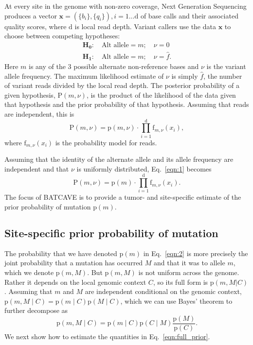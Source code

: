 \documentclass[a4,center,fleqn]{NAR}
\newcommand{\batcave}{BATCAVE\xspace}
\begin{document}
At every site in the genome with non-zero coverage, Next Generation Sequencing produces a vector $\mathbf{x}  = (\{b_i\},\{q_i\}), i = 1\dots \mathrm{d}$ of base calls and their associated quality scores, where $\mathrm{d}$ is local read depth.
Variant callers use the data $\mathbf{x}$ to choose between competing hypotheses:
\begin{equation}
  \label{eqn:hypothesis}
  \begin{array}{l}
    \mathbf{H_0}:\quad \textrm{Alt allele} = m;\quad\nu = 0\\
    \mathbf{H_1}:\quad \textrm{Alt allele} = m;\quad\nu = \hat{f}.
  \end{array}
\end{equation}
Here $m$ is any of the 3 possible alternate non-reference bases and $\nu$ is the variant allele frequency.
The maximum likelihood estimate of $\nu$ is simply $\hat{f}$, the number of variant reads divided by the local read depth.
The posterior probability of a given hypothesis, $\mathrm{P}(m,\nu)$, is the product of the likelihood of the data given that hypothesis and the prior probability of that hypothesis. 
Assuming that reads are independent, this is
\begin{equation}\label{eqn:1}
  \mathrm{P}(m,\nu) = \mathrm{p}(m,\nu) \cdot \prod_{i=1}^{\mathrm{d}} \textrm{f}_{m,\nu}(x_i),
\end{equation}
where $\textrm{f}_{m,\nu}(x_i)$ is the probability model for reads.

Assuming that the identity of the alternate allele and its allele frequency are independent and that $\nu$ is uniformly distributed, Eq.~\ref{eqn:1} becomes
\begin{equation}  \label{eqn:2}
  \mathrm{P}(m,\nu) = \mathrm{p}(m) \cdot \prod_{i=1}^{\mathrm{d}} \textrm{f}_{m,\nu}(x_i).
\end{equation}
The focus of \batcave is to provide a tumor- and site-specific estimate of the prior probability of mutation $\mathrm{p}(m)$.

\subsection{Site-specific prior probability of mutation}
The probability that we have denoted $\mathrm{p}(m)$ in Eq.~\ref{eqn:2} is more precisely the joint probability that a mutation has occurred $M$ and that it was to allele $m$, which we denote $\mathrm{p}(m,M)$.
But $\mathrm{p}(m,M)$ is not uniform across the genome.
Rather it depends on the local genomic context $C$, so its full form is $\mathrm{p}(m,M | C)$ \cite{Buisson2019}.
Assuming that $m$ and $M$ are independent conditional on the genomic context, $\mathrm{p}(m,M \mid C) = \mathrm{p}(m \mid C) \mathrm{p}(M \mid C)$, which we can use Bayes' theorem to further decompose as 
\begin{equation}
  \label{eqn:full_prior}
  \mathrm{p}(m,M \mid C) = \mathrm{p}(m \mid C) \mathrm{p}(C \mid M)\frac{\mathrm{p}(M)}{\mathrm{p}(C)}.
\end{equation}
We next show how to estimate the quantities in Eq.~\ref{eqn:full_prior}.
\end{document}
